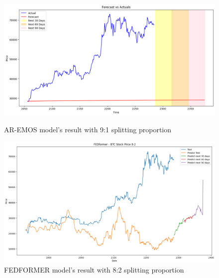\documentclass{ieeeojies}
\begin{document}
\begin{figure}[H]
    \centering
    \begin{minipage}{0.23\textwidth}
    \centering
    \includegraphics[width=1\textwidth]{bibliography/Figure/PREDICT/BTC_AR-EMOS_9-1.png}
    \caption{AR-EMOS model's result with 9:1 splitting proportion}
    \label{fig10}
    \end{minipage}
    \hfill
    \begin{minipage}{0.23\textwidth}
    \centering
    \includegraphics[width=1\textwidth]{bibliography/Figure/FED btc 82.png}
    \caption{FEDFORMER model's result with 8:2 splitting proportion}
    \label{fig11}
    \end{minipage}
\end{figure}
\end{document}
